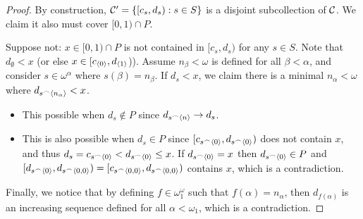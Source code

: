\begin{proof}
  By construction, $\mathcal{C}' = \{[c_s,d_s) : s\in S\}$ is a disjoint subcollection of $\mathcal{C}$. We claim it also must cover $[0,1)\cap P$.

  Suppose not: $x\in[0,1)\cap P$ is not contained in $[c_s,d_s)$ for any $s\in S$. Note that $d_\emptyset<x$ (or else $x\in[c_{\langle0\rangle},d_{\langle1\rangle}$)). Assume $n_\beta<\omega$ is defined for all $\beta<\alpha$, and consider $s\in\omega^\alpha$ where $s(\beta)=n_\beta$. If $d_s<x$, we claim there is a minimal $n_\alpha<\omega$ where $d_{s^\frown\langle n_\alpha\rangle}<x$.
    \begin{itemize}
      \item This possible when $d_s\not\in P$ since $d_{s^\frown\langle n\rangle}\to d_s$.
      \item This is also possible when $d_s\in P$ since $[c_{s^\frown\langle0\rangle},d_{s^\frown\langle0\rangle})$ does not contain $x$, and thus $d_s=c_{s^\frown\langle0\rangle}<d_{s^\frown\langle0\rangle}\leq x$. If $d_{s^\frown\langle0\rangle} = x$ then $d_{s^\frown\langle0\rangle}\in P$ and $[d_{s^\frown\langle0\rangle},d_{s^\frown\langle0,0\rangle})=[c_{s^\frown\langle0,0\rangle},d_{s^\frown\langle0,0\rangle})$ contains $x$, which is a contradiction.
    \end{itemize}

  Finally, we notice that by defining $f\in\omega^\omega_1$ such that $f(\alpha)=n_\alpha$, then $d_{f(\alpha)}$ is an increasing sequence defined for all $\alpha<\omega_1$, which is a contradiction.
\end{proof}

